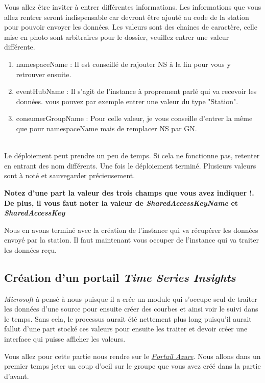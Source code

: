 \begin{enumerate}
Vous allez être inviter à entrer différentes informations. Les informations que vous allez rentrer seront indispensable car devront être ajouté au code de la station pour pouvoir envoyer les données. Les valeurs sont des chaines de caractère, celle mise en photo sont arbitraires pour le dossier, veuillez entrer une valeur différente.
	\begin{enumerate}
		\item namespaceName : Il est conseillé de rajouter NS à la fin pour vous y retrouver ensuite. %
		\item eventHubName : Il s'agit de l'instance à proprement parlé qui va recevoir les données. vous pouvez par exemple entrer une valeur du type "Station".
		\item consumerGroupName : Pour celle valeur, je vous conseille d'entrer la même que pour namespaceName mais de remplacer NS par GN.
	\end{enumerate}\\ 
Le déploiement peut prendre un peu de temps. Si cela ne fonctionne pas, retenter en entrant des nom différents.
Une fois le déploiement terminé. Plusieurs valeurs sont à noté et sauvegarder précieusement.

\textbf{Notez d'une part la valeur des trois champs que vous avez indiquer !.
De plus, il vous faut noter la valeur de \textit{SharedAccessKeyName} et \textit{SharedAccessKey}}

\end{enumerate}

Nous en avons terminé avec la création de l'instance qui va récupérer les données envoyé par la station. Il faut maintenant vous occuper de l'instance qui va traiter les données reçu.

\subsection{Création d'un portail \textit{Time Series Insights}}

\textit{Microsoft} à pensé à nous puisque il a crée un module qui s'occupe seul de traiter les données d'une source pour ensuite créer des courbes et ainsi voir le suivi dans le temps. Sans cela, le processus aurait été nettement plus long puisqu'il aurait fallut d'une part stocké ces valeurs pour ensuite les traiter et devoir créer une interface qui puisse afficher les valeurs.

Vous allez pour cette partie nous rendre sur le \href{https://portal.azure.com}{\textit{Portail Azure}}. Nous allons dans un premier temps jeter un coup d'oeil sur le groupe que vous avez créé dans la partie d'avant. %
\\

